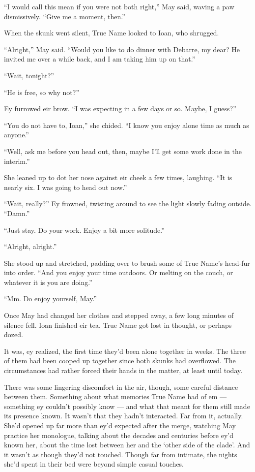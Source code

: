 ``I would call this mean if you were not both right,'' May said, waving a paw dismissively. ``Give me a moment, then.''

When the skunk went silent, True Name looked to Ioan, who shrugged.

``Alright,'' May said. ``Would you like to do dinner with Debarre, my dear? He invited me over a while back, and I am taking him up on that.''

``Wait, tonight?''

``He is free, so why not?''

Ey furrowed eir brow. ``I was expecting in a few days or so. Maybe, I guess?''

``You do not have to, Ioan,'' she chided. ``I know you enjoy alone time as much as anyone.''

``Well, ask me before you head out, then, maybe I'll get some work done in the interim.''

She leaned up to dot her nose against eir cheek a few times, laughing. ``It is nearly six. I was going to head out now.''

``Wait, really?'' Ey frowned, twisting around to see the light slowly fading outside. ``Damn.''

``Just stay. Do your work. Enjoy a bit more solitude.''

``Alright, alright.''

She stood up and stretched, padding over to brush some of True Name's head-fur into order. ``And you enjoy your time outdoors. Or melting on the couch, or whatever it is you are doing.''

``Mm. Do enjoy yourself, May.''

Once May had changed her clothes and stepped away, a few long minutes of silence fell. Ioan finished eir tea. True Name got lost in thought, or perhaps dozed.

It was, ey realized, the first time they'd been alone together in weeks. The three of them had been cooped up together since both skunks had overflowed. The circumstances had rather forced their hands in the matter, at least until today.

There was some lingering discomfort in the air, though, some careful distance between them. Something about what memories True Name had of em — something ey couldn't possibly know — and what that meant for them still made its presence known. It wasn't that they hadn't interacted. Far from it, actually. She'd opened up far more than ey'd expected after the merge, watching May practice her monologue, talking about the decades and centuries before ey'd known her, about the time lost between her and the `other side of the clade'. And it wasn't as though they'd not touched. Though far from intimate, the nights she'd spent in their bed were beyond simple casual touches.

